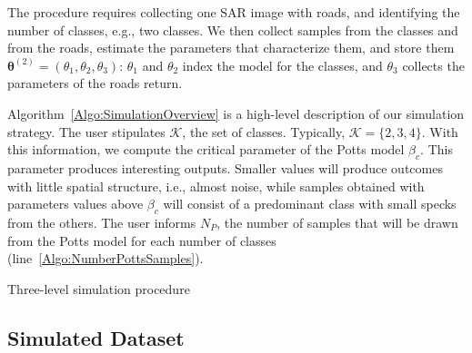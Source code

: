 \documentclass[
  journal,
]{IEEEtran}%
\begin{document}
The procedure requires collecting one SAR image with roads, and
identifying the number of classes, e.g., two classes. We then collect
samples from the classes and from the roads, estimate the parameters
that characterize them, and store them
\(\bm\theta^{(2)}=(\theta_1,\theta_2,\theta_3)\): \(\theta_1\) and
\(\theta_2\) index the model for the classes, and \(\theta_3\) collects
the parameters of the roads return.

Algorithm~\ref{Algo:SimulationOverview} is a high-level description of
our simulation strategy. The user stipulates \(\mathcal K\), the set of
classes. Typically, \(\mathcal K=\{2,3,4\}\). With this information, we
compute the critical parameter of the Potts model \(\beta_c\). This
parameter produces interesting outputs. Smaller values will produce
outcomes with little spatial structure, i.e., almost noise, while
samples obtained with parameters values above \(\beta_c\) will consist
of a predominant class with small specks from the others. The user
informs \(N_P\), the number of samples that will be drawn from the Potts
model for each number of classes (line~\ref{Algo:NumberPottsSamples}).

\begin{algorithm}[hbt]
\SetAlgoLined
{}
\BlankLine
{}
\BlankLine
{}
\caption{Three-level simulation procedure}\label{Algo:SimulationOverview}
\end{algorithm}

\subsection{Simulated Dataset}\label{simulated-dataset}
\end{document}

